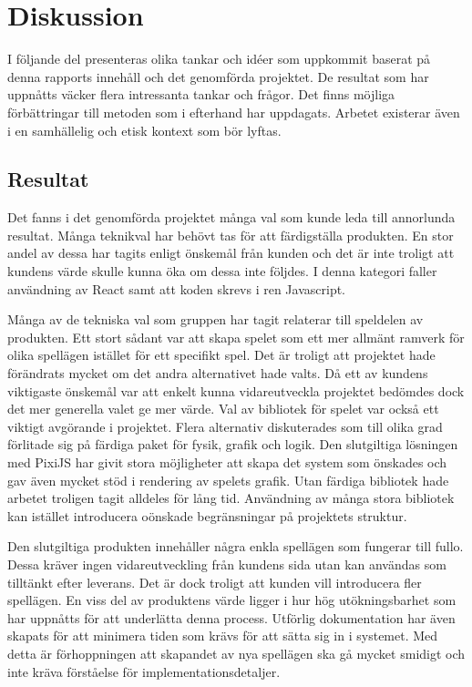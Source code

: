 \chapter{Diskussion}
\label{cha:discussion}

I följande del presenteras olika tankar och idéer som uppkommit baserat på denna rapports innehåll och det genomförda projektet. De resultat som har uppnåtts väcker flera intressanta tankar och frågor. Det finns möjliga förbättringar till metoden som i efterhand har uppdagats. Arbetet existerar även i en samhällelig och etisk kontext som bör lyftas.

\section{Resultat}
\label{sec:discussion-results}

Det fanns i det genomförda projektet många val som kunde leda till annorlunda resultat. Många teknikval har behövt tas för att färdigställa produkten. En stor andel av dessa har tagits enligt önskemål från kunden och det är inte troligt att kundens värde skulle kunna öka om dessa inte följdes. I denna kategori faller användning av React samt att koden skrevs i ren Javascript.

Många av de tekniska val som gruppen har tagit relaterar till speldelen av produkten. Ett stort sådant var att skapa spelet som ett mer allmänt ramverk för olika spellägen istället för ett specifikt spel. Det är troligt att projektet hade förändrats mycket om det andra alternativet hade valts. Då ett av kundens viktigaste önskemål var att enkelt kunna vidareutveckla projektet bedömdes dock det mer generella valet ge mer värde. Val av bibliotek för spelet var också ett viktigt avgörande i projektet. Flera alternativ diskuterades som till olika grad förlitade sig på färdiga paket för fysik, grafik och logik. Den slutgiltiga lösningen med PixiJS har givit stora möjligheter att skapa det system som önskades och gav även mycket stöd i rendering av spelets grafik. Utan färdiga bibliotek hade arbetet troligen tagit alldeles för lång tid. Användning av många stora bibliotek kan istället introducera oönskade begränsningar på projektets struktur.

Den slutgiltiga produkten innehåller några enkla spellägen som fungerar till fullo. Dessa kräver ingen vidareutveckling från kundens sida utan kan användas som tilltänkt efter leverans. Det är dock troligt att kunden vill introducera fler spellägen. En viss del av produktens värde ligger i hur hög utökningsbarhet som har uppnåtts för att underlätta denna process. Utförlig dokumentation har även skapats för att minimera tiden som krävs för att sätta sig in i systemet. Med detta är förhoppningen att skapandet av nya spellägen ska gå mycket smidigt och inte kräva förståelse för implementationsdetaljer.

